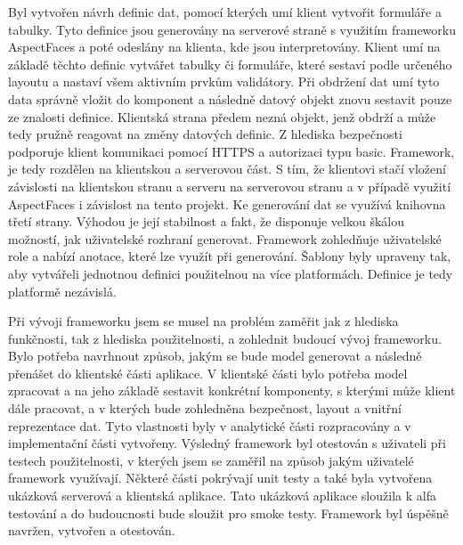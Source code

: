 Byl vytvořen návrh definic dat, pomocí kterých umí klient vytvořit formuláře a tabulky. Tyto definice jsou generovány na serverové straně s využitím frameworku AspectFaces a poté odeslány na klienta, kde jsou interpretovány. Klient umí na základě těchto definic vytvářet tabulky či formuláře, které sestaví podle určeného layoutu a nastaví všem aktivním prvkům validátory. Při obdržení dat umí tyto data správně vložit do komponent a následně datový objekt znovu sestavit pouze ze znalosti definice. Klientská strana předem nezná objekt, jenž obdrží a může tedy pružně reagovat na změny datových definic. Z hlediska bezpečnosti podporuje klient komunikaci pomocí HTTPS a autorizaci typu basic. Framework, je tedy rozdělen na klientskou a serverovou část. S tím, že klientovi stačí vložení závislosti na klientskou stranu a serveru na serverovou stranu a v případě využití AspectFaces i závislost na tento projekt. Ke generování dat se využívá knihovna třetí strany. Výhodou je její stabilnost a fakt, že disponuje velkou škálou možností, jak uživatelské rozhraní generovat. Framework zohledňuje uživatelské role a nabízí anotace, které lze využít při generování. Šablony byly upraveny tak, aby vytvářeli jednotnou definici použitelnou na více platformách. Definice je tedy platformě nezávislá. 

Při vývoji frameworku jsem se musel na problém zaměřit jak z hlediska funkčnosti, tak z hlediska použitelnosti, a zohlednit budoucí vývoj frameworku. Bylo potřeba navrhnout způsob, jakým se bude model generovat a následně přenášet do klientské části aplikace. V klientské části bylo potřeba model zpracovat a na jeho základě sestavit konkrétní komponenty, s kterými může klient dále pracovat, a v kterých bude zohledněna bezpečnost, layout a vnitřní reprezentace dat. Tyto vlastnosti byly v analytické části rozpracovány a v implementační části vytvořeny. Výsledný framework byl otestován s uživateli při testech použitelnosti, v kterých jsem se zaměřil na způsob jakým uživatelé framework využívají. Některé části pokrývají unit testy a také byla vytvořena ukázková serverová a klientská aplikace. Tato ukázková aplikace sloužila k alfa testování a do budoucnosti bude sloužit pro smoke testy. Framework byl úspěšně navržen, vytvořen a otestován.